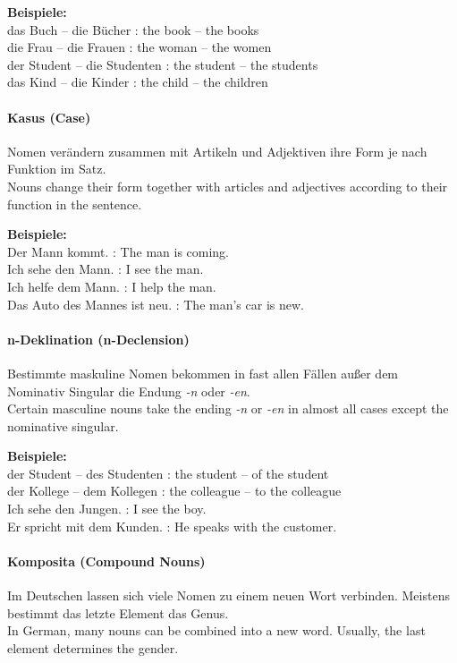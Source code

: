 \documentclass[a4paper]{article}
\begin{document}
            \textbf{Beispiele:}\\
            das Buch -- die Bücher : the book -- the books\\
            die Frau -- die Frauen : the woman -- the women\\
            der Student -- die Studenten : the student -- the students\\
            das Kind -- die Kinder : the child -- the children
        
        \paragraph{Kasus {\small (Case)}}
            Nomen verändern zusammen mit Artikeln und Adjektiven ihre Form je nach Funktion im Satz.\\
            Nouns change their form together with articles and adjectives according to their function in the sentence.
            
            \textbf{Beispiele:}\\
            Der Mann kommt. : The man is coming.\\
            Ich sehe den Mann. : I see the man.\\
            Ich helfe dem Mann. : I help the man.\\
            Das Auto des Mannes ist neu. : The man's car is new.
        
        \paragraph{n-Deklination {\small (n-Declension)}}
            Bestimmte maskuline Nomen bekommen in fast allen Fällen außer dem Nominativ Singular die Endung \textit{-n} oder \textit{-en}.\\
            Certain masculine nouns take the ending \textit{-n} or \textit{-en} in almost all cases except the nominative singular.
            
            \textbf{Beispiele:}\\
            der Student -- des Studenten : the student -- of the student\\
            der Kollege -- dem Kollegen : the colleague -- to the colleague\\
            Ich sehe den Jungen. : I see the boy.\\
            Er spricht mit dem Kunden. : He speaks with the customer.
        
        \paragraph{Komposita {\small (Compound Nouns)}}
            Im Deutschen lassen sich viele Nomen zu einem neuen Wort verbinden. Meistens bestimmt das letzte Element das Genus.\\
            In German, many nouns can be combined into a new word. Usually, the last element determines the gender.
            
\end{document}
